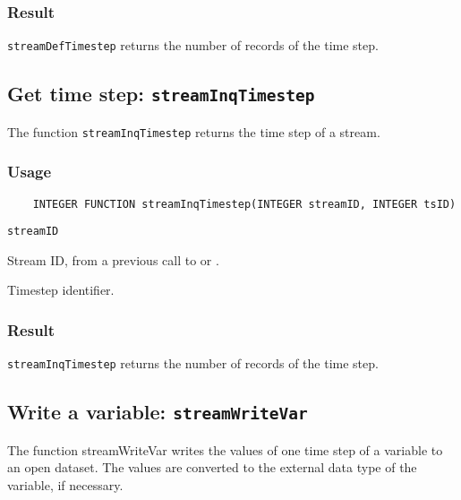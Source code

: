 \subsubsection*{Result}

{\tt streamDefTimestep} returns the number of records of the time step.



\subsection{Get time step: {\tt streamInqTimestep}}
\label{streamInqTimestep}

The function {\tt streamInqTimestep} returns the time step of a stream.

\subsubsection*{Usage}

\begin{verbatim}
    INTEGER FUNCTION streamInqTimestep(INTEGER streamID, INTEGER tsID)
\end{verbatim}

\hspace*{4mm}\begin{minipage}[]{15cm}
\begin{deflist}{\tt streamID\ }
\item[{\tt streamID}]
Stream ID, from a previous call to {} or {}.
\item[{\tt tsID}]
Timestep identifier.

\end{deflist}
\end{minipage}

\subsubsection*{Result}

{\tt streamInqTimestep} returns the number of records of the time step.



\subsection{Write a variable: {\tt streamWriteVar}}
\label{streamWriteVar}

The function streamWriteVar writes the values of one time step of a variable to an open dataset.
The values are converted to the external data type of the variable, if necessary.
